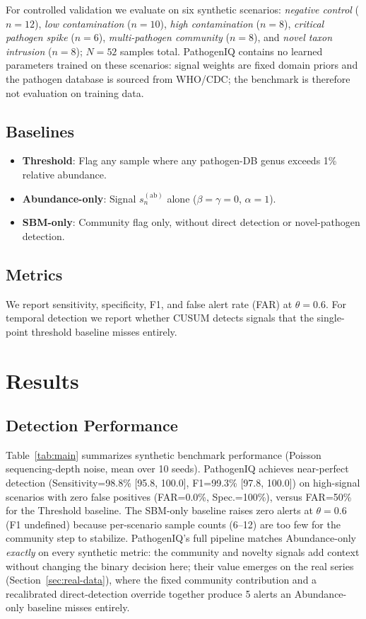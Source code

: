 \documentclass[conference]{IEEEtran}
\begin{document}
For controlled validation we evaluate on six synthetic scenarios:
\emph{negative control} ($n=12$), \emph{low contamination} ($n=10$),
\emph{high contamination} ($n=8$), \emph{critical pathogen spike}
($n=6$), \emph{multi-pathogen community} ($n=8$), and \emph{novel taxon
intrusion} ($n=8$); $N=52$ samples total. PathogenIQ contains no
learned parameters trained on these scenarios: signal weights are
fixed domain priors and the pathogen database is sourced from WHO/CDC;
the benchmark is therefore not evaluation on training data.

\subsection{Baselines}

\begin{itemize}
  \item \textbf{Threshold}: Flag any sample where any pathogen-DB genus
    exceeds 1\% relative abundance.
  \item \textbf{Abundance-only}: Signal $s_n^{(\text{ab})}$ alone
    ($\beta=\gamma=0$, $\alpha=1$).
  \item \textbf{SBM-only}: Community flag only, without direct detection
    or novel-pathogen detection.
\end{itemize}

\subsection{Metrics}

We report sensitivity, specificity, F1, and false alert rate (FAR) at
$\theta=0.6$. For temporal detection we report whether CUSUM detects
signals that the single-point threshold baseline misses entirely.

\section{Results}
\label{sec:results}

\subsection{Detection Performance}

Table~\ref{tab:main} summarizes synthetic benchmark performance (Poisson
sequencing-depth noise, mean over 10 seeds). PathogenIQ achieves
near-perfect detection (Sensitivity=98.8\% [95.8, 100.0], F1=99.3\%
[97.8, 100.0]) on high-signal scenarios with zero false positives
(FAR=0.0\%, Spec.=100\%), versus FAR=50\% for the Threshold baseline. The
SBM-only baseline raises zero alerts at $\theta=0.6$ (F1 undefined)
because per-scenario sample counts (6--12) are too few for the community
step to stabilize. PathogenIQ's full pipeline matches Abundance-only
\emph{exactly} on every synthetic metric: the community and novelty
signals add context without changing the binary decision here; their
value emerges on the real series (Section~\ref{sec:real-data}), where the
fixed community contribution and a recalibrated direct-detection override
together produce 5 alerts an Abundance-only baseline misses entirely.
\end{document}

